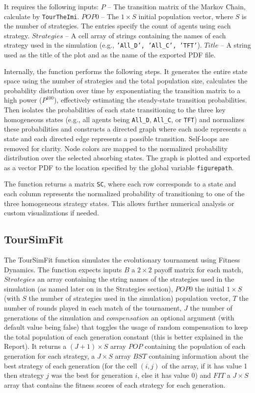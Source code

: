 It requires the following inputs: $P$ – The transition matrix of the Markov Chain, calculate by \texttt{TourTheImi}. $POP0$ – The $1 \times S$ initial population vector, where $S$ is the number of strategies. The entries specify the count of agents using each strategy. $Strategies$ – A cell array of strings containing the names of each strategy used in the simulation (e.g., \texttt{{'All\_D', 'All\_C', 'TFT'}}). $Title$ – A string used as the title of the plot and as the name of the exported PDF file.

Internally, the function performs the following steps. It generates the entire state space using the number of strategies and the total population size, calculates the probability distribution over time by exponentiating the transition matrix to a high power ($P^{100}$), effectively estimating the steady-state transition probabilities. Then isolates the probabilities of each state transitioning to the three key homogeneous states (e.g., all agents being \texttt{{All\_D}}, \texttt{{All\_C}}, or \texttt{TFT}) and normalizes these probabilities and constructs a directed graph where each node represents a state and each directed edge represents a possible transition. Self-loops are removed for clarity. Node colors are mapped to the normalized probability distribution over the selected absorbing states. The graph is plotted and exported as a vector PDF to the location specified by the global variable \texttt{figurepath}.

The function returns a matrix \texttt{SC}, where each row corresponds to a state and each column represents the normalized probability of transitioning to one of the three homogeneous strategy states. This allows further numerical analysis or custom visualizations if needed.

\subsection{TourSimFit}
The TourSimFit function simulates the evolutionary tournament using Fitness Dynamics. The function expects inputs $B$ a $2 \times 2$ payoff matrix for each match, $Strategies$ an array containing the string names of the strategies used in the simulation (as named later on in the Strategies section), $POP0$ the initial $1 \times S$ (with $S$ the number of strategies used in the simulation) population vector, $T$ the number of rounds played in each match of the tournament, $J$ the number of generations of the simulation and $compensation$ an optional argument (with default value being false) that toggles the usage of random compensation to keep the total population of each generation constant (this is better explained in the Report). It returns a $(J+1) \times S$ array $POP$ containing the population of each generation for each strategy, a $J \times S$ array $BST$ containing information about the best strategy of each generation (for the cell $(i,j)$ of the array, if it has value 1 then strategy $j$ was the best for generation $i$, else it has value 0) and $FIT$ a $J \times S$ array that contains the fitness scores of each strategy for each generation.

